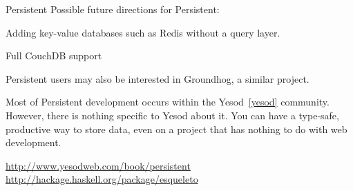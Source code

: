 \begin{hcarentry}{Persistent}
\FuturePlans 
Possible future directions for Persistent:
\begin{compactitem}
\item Adding key-value databases such as Redis without a query layer.
\item Full CouchDB support
\end{compactitem}

Persistent users may also be interested in Groundhog, a similar project.

Most of Persistent development occurs within the Yesod~\cref{yesod} community.
However, there is nothing specific to Yesod about it.
You can have a type-safe, productive way to store data,
even on a project that has nothing to do with web development.


\FurtherReading 
\url{http://www.yesodweb.com/book/persistent} 
\url{http://hackage.haskell.org/package/esqueleto}
\end{hcarentry}
